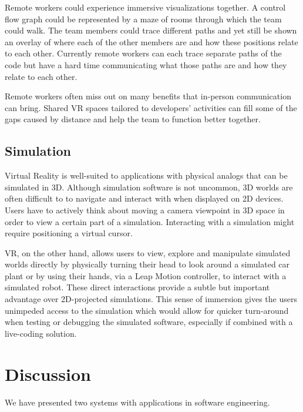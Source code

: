 \documentclass[conference]{IEEEtran}
\begin{document}
Remote workers could experience immersive visualizations together. 
A control flow graph could be represented by a maze of rooms through which the team could walk. 
The team members could trace different paths and yet still be shown an overlay of where each of the other members are and how these positions relate to each other. 
Currently remote workers can each trace separate paths of the code but have a hard time communicating what those paths are and how they relate to each other.

Remote workers often miss out on many benefits that in-person communication can bring. 
Shared VR spaces tailored to developers' activities can fill some of the gaps caused by distance and help the team to function better together. 

\subsection{Simulation}
Virtual Reality is well-suited to applications with physical analogs that can be simulated in 3D. 
Although simulation software is not uncommon, 3D worlds are often difficult to to navigate and interact with when displayed on 2D devices. 
Users have to actively think about moving a camera viewpoint in 3D space in order to view a certain part of a simulation. 
Interacting with a simulation might require positioning a virtual cursor. 

VR, on the other hand, allows users to view, explore and manipulate simulated worlds directly by physically turning their head to look around a simulated car plant or by using their hands, via a Leap Motion controller, to interact with a simulated robot. 
These direct interactions provide a subtle but important advantage over 2D-projected simulations. 
This sense of immersion gives the users unimpeded access to the simulation which would allow for quicker turn-around when testing or debugging the simulated software, especially if combined with a live-coding solution.

\section{Discussion}
We have presented two systems with applications in software engineering.
\end{document}
